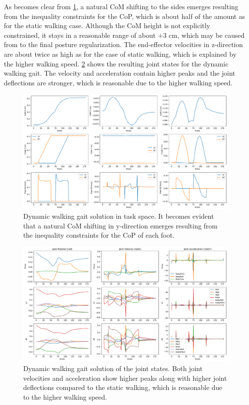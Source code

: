 As becomes clear from \cref{fig:walkDynamic_TaskSpace}, a natural \gls{CoM} shifting to the sides emerges resulting from the inequality constraints for the \gls{CoP}, which is about half of the amount as for the static walking case. Although the \gls{CoM} height is not explicitly constrained, it stays in a reasonable range of about $+$3 cm, which may be caused from to the final posture regularization. The end-effector velocities in z-direction are about twice as high as for the case of static walking, which is explained by the higher walking speed. 
\cref{fig:walkDynamic_JointState} shows the resulting joint states for the dynamic walking gait. The velocity and acceleration contain higher peaks and the joint deflections are stronger, which is reasonable due to the higher walking speed.       

\begin{figure}
\centering	
\includegraphics[width=1\textwidth]{fig/walkDynamic/TaskSpace}
\caption[Dynamic walking gait solution in task space]{Dynamic walking gait solution in task space. It becomes evident that a natural \gls{CoM} shifting in y-direction emerges resulting from the inequality constraints for the \gls{CoP} of each foot.}
\label{fig:walkDynamic_TaskSpace}
\end{figure} 

\begin{figure}
\centering	
\includegraphics[width=1\textwidth]{fig/walkDynamic/JointState}
\caption[Dynamic walking gait solution of the joint states.]{Dynamic walking gait solution of the joint states. Both joint velocities and acceleration show higher peaks along with higher joint deflections compared to the static walking, which is reasonable due to the higher walking speed.}
\label{fig:walkDynamic_JointState}
\end{figure} 

